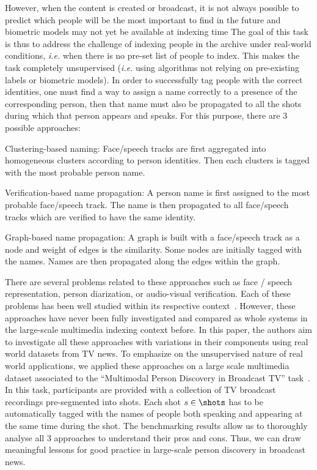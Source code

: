 However, when the content is created or broadcast, it is not always possible to predict which people will be the most important to find in the future and biometric models may not yet be available at indexing time The goal of this task is thus to address the challenge of indexing people in the archive under real-world conditions, \emph{i.e.} when there is no pre-set list of people to index.
%
This makes the task completely unsupervised (\emph{i.e.} using algorithms not relying on pre-existing labels or biometric models).
%
In order to successfully tag people with the correct identities, one must find a way to assign a name correctly to a presence of the corresponding person, then that name must also be propagated to all the shots during which that person appears and speaks. For this purpose, there are 3 possible approaches:
\begin{compactitem}
\item{Clustering-based naming: Face/speech tracks are first aggregated into homogeneous clusters according to person identities. Then each clusters is tagged with the most probable person name.}
\item{Verification-based name propagation: A person name is first assigned to the most probable face/speech track. The name is then propagated to all face/speech tracks which are verified to have the same identity.}
\item{Graph-based name propagation: A graph is built with a face/speech track as a node and weight of edges is the similarity. Some nodes are initially tagged with the names. Names are then propagated along the edges within the graph.}
\end{compactitem}

There are several problems related to these approaches such as face / speech representation, person diarization, or audio-visual verification. Each of these problems has been well studied within its respective context~\cite{recog,veri,rep}. 
%
However, these approaches have never been fully investigated and compared as whole systems in the large-scale multimedia indexing context before. In this paper, the authors aim to investigate all these approaches with variations in their components using real world datasets from TV news. 
%
To emphasize on the unsupervised nature of real world applications, we applied these approaches on a large scale multimedia dataset associated to the ``Multimodal Person Discovery in Broadcast TV'' task~\cite{POIGNANT--MEDIAEVAL--2015,bredin2016mediaeval}. In this task, participants are provided with a collection of TV broadcast recordings pre-segmented into shots. Each shot $s \in \shots$ has to be automatically tagged with the names of people both speaking and appearing at the same time during the shot.
%
The benchmarking results allow us to thoroughly analyse all 3 approaches to understand their pros and cons. Thus, we can draw meaningful lessons for good practice in large-scale person discovery in broadcast news.

